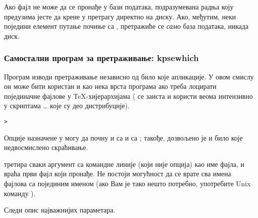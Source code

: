 \documentclass{article}
\begin{document}
Ако фајл не може да се пронађе у бази података, подразумевана радња
коју предузима \KPS{} јесте да крене у претрагу директно на диску.
Ако, међутим, неки поједини елемент путање почиње са \samp{!!},
претражиће се \emph{само} база података, никада  диск.


\subsubsection{Самостални програм за претраживање: kpsewhich}
\label{sec:invoking-kpsewhich}

Програм  изводи претраживање независно од било које
апликације. У овом смислу он може бити користан и као нека врста
програма  ако треба лоцирати појединачне фајлове у
\TeX{}-хијерархијама ( се заиста и користи веома
интензивно у скриптама \ldots{} које су део дистрибуције).

\begin{alltt}> 
\end{alltt}
Опције назначене у  могу да почну и са \samp{-} и са
\samp{-{}-}; такође, дозвољено је и било које недвосмислено скраћивање.

\KPS{} третира сваки аргумент са командне линије (који није опција)
као име фајла, и враћа први фајл који пронађе. Не постоји могућност
да се врате сва имена фајлова са појединим именом (ако Вам је тако
нешто потребно, употребите Unix команду ).

Следи опис најважнијих параметара.
\end{document}
